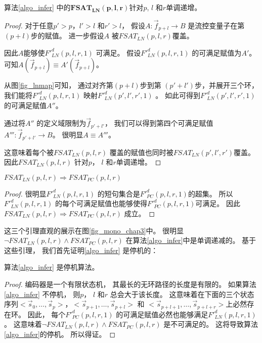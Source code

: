 \begin{lemma}\label{lemmalninc}
算法\ref{algo_infer} 中的$\mathbf{FSAT_{LN}(p,l,r)}$针对$p$, $l$ 和$r$单调递增。
\end{lemma}
\begin{proof}
对于任意$p'>p$，$l'>l$ 和$r'>l$，
假设$A:\vec{f}_{p+l}\to B$ 是流控变量子在第$(p+l)$步的赋值。
进一步假设$A$ 被$FSAT_{LN}(p,l,r)$覆盖。

因此$A$能够使$F'^d_{LN}(p,l,r,1)$ 可满足。
假设$F'^d_{LN}(p,l,r,1)$ 的可满足赋值为$A'$。
可知$A(\vec{f}_{p+l})\equiv A'(\vec{f}_{p+l})$。

从图\ref{fig_lnmap}可知，
通过对齐第$(p+l)$步到第 $(p'+l')$步，并展开三个环，
我们能将$F'^d_{LN}(p,l,r,1)$ 映射$F'^d_{LN}(p',l',r',1)$ 。
如此可得到$F'^d_{LN}(p',l',r',1)$的可满足赋值$A''$。

通过将$A''$ 的定义域限制为$\vec{f}_{p'+l'}$，
我们可以得到第四个可满足赋值$A''':\vec{f}_{p'+l'}\to B$。
很明显$A\equiv A'''$。

这意味着每个被$FSAT_{LN}(p,l,r)$ 覆盖的赋值也同时被$FSAT_{LN}(p',l',r')$覆盖。
因此$FSAT_{LN}(p,l,r)$ 针对$p$， $l$ 和$r$单调递增。
\end{proof}


\begin{lemma}\label{lemmaln2pc}
$FSAT_{LN}(p,l,r)\Rightarrow FSAT_{PC}(p,l,r)$
\end{lemma}
\begin{proof}
很明显$F'^d_{LN}(p,l,r,1)$ 的短句集合是$F'^d_{PC}(p,l,r,1)$的超集。
所以$F'^d_{LN}(p,l,r,1)$ 的每个可满足赋值也能够使得$F'^d_{PC}(p,l,r,1)$可满足。
因此$FSAT_{LN}(p,l,r)\Rightarrow FSAT_{PC}(p,l,r)$ 成立。
\end{proof}

这三个引理直观的展示在图\ref{fig_mono_chap3}中。
很明显$\neg FSAT_{LN}(p,l,r)\wedge FSAT_{PC}(p,l,r)$ 在算法\ref{algo_infer}中是单调递减的。
基于这些引理，
我们首先证明\ref{algo_infer} 是停机的：

\begin{theorem}
算法\ref{algo_infer} 是停机算法。
\end{theorem}


\begin{proof}
编码器是一个有限状态机，
其最长的无环路径的长度是有限的。
如果算法\ref{algo_infer} 不停机，
则$p$， $l$ 和$r$ 总会大于该长度。
这意味着在下面的三个状态序列$<\vec{s}_{0},\dots,\vec{s}_{p}>$，$<\vec{s}_{p+1},\dots,\vec{s}_{p+l}>$ 和
$<\vec{s}_{p+l+1},\dots,\vec{s}_{p+l+r}>$上必然存在环。
因此，
每个$F'^d_{PC}(p,l,r,1)$ 的可满足赋值必然也能够满足$F'^d_{LN}(p,l,r,1)$。
这意味着$\neg FSAT_{LN}(p,l,r)\wedge FSAT_{PC}(p,l,r)$ 是不可满足的。
这将导致算法\ref{algo_infer}的停机。
所以得证。
\end{proof}


